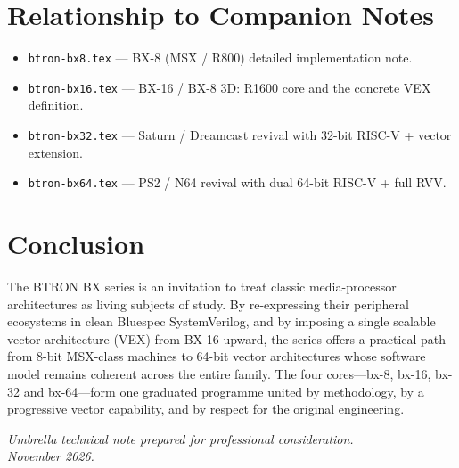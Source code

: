 \documentclass[11pt,a4paper]{article}
\begin{document}
\section{Relationship to Companion Notes}

\begin{itemize}[leftmargin=1.5em]
  \item \texttt{btron-bx8.tex} --- BX-8 (MSX / R800) detailed implementation note.
  \item \texttt{btron-bx16.tex} --- BX-16 / BX-8 3D: R1600 core and the concrete VEX definition.
  \item \texttt{btron-bx32.tex} --- Saturn / Dreamcast revival with 32-bit RISC-V + vector extension.
  \item \texttt{btron-bx64.tex} --- PS2 / N64 revival with dual 64-bit RISC-V + full RVV.
\end{itemize}

\section{Conclusion}

The BTRON BX series is an invitation to treat classic media-processor architectures as living subjects of study. By re-expressing their peripheral ecosystems in clean Bluespec SystemVerilog, and by imposing a single scalable vector architecture (VEX) from BX-16 upward, the series offers a practical path from 8-bit MSX-class machines to 64-bit vector architectures whose software model remains coherent across the entire family. The four cores---bx-8, bx-16, bx-32 and bx-64---form one graduated programme united by methodology, by a progressive vector capability, and by respect for the original engineering.

\vspace{1.5em}
\noindent\textit{Umbrella technical note prepared for professional consideration.\\
November 2026.}
\end{document}

